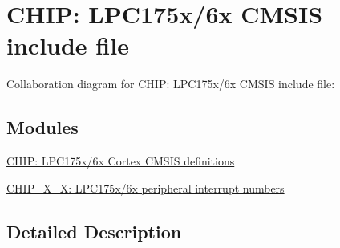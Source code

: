 \hypertarget{group__CMSIS__175X__6X}{}\section{C\+H\+IP\+: L\+P\+C175x/6x C\+M\+S\+IS include file}
\label{group__CMSIS__175X__6X}
Collaboration diagram for C\+H\+IP\+: L\+P\+C175x/6x C\+M\+S\+IS include file\+:
\subsection*{Modules}
\begin{DoxyCompactItemize}
\item 
\hyperlink{group__CMSIS__175X__6X__COMMON}{C\+H\+I\+P\+: L\+P\+C175x/6x Cortex C\+M\+S\+I\+S definitions}
\item 
\hyperlink{group__CMSIS__175X__6X__IRQ}{C\+H\+I\+P\+\_\+X\+\_\+X\+: L\+P\+C175x/6x peripheral interrupt numbers}
\end{DoxyCompactItemize}


\subsection{Detailed Description}
